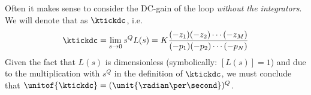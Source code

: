 Often it makes sense to consider the DC-gain of the loop \emph {without the integrators}. We will denote that as $\ktickdc $, i.e. \begin {align} \ktickdc = \lim _{s\to 0} s^Q L(s) = K \frac {(-z_1)(-z_2)\cdots (-z_M)}{(-p_1)(-p_2)\cdots (-p_N)} \end {align} Given the fact that $L(s)$ is dimensionless (symbolically: $[L(s)] = 1$) and due to the multiplication with $s^Q$ in the definition of $\ktickdc $, we must conclude that $\unitof {\ktickdc } = (\unit {\radian \per \second })^Q$.
